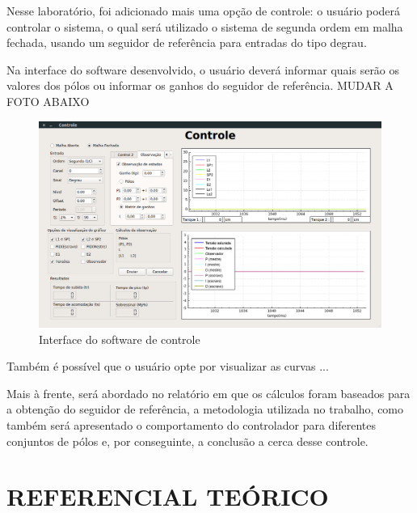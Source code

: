 \documentclass[a4paper,12pt]{article}
\begin{document}
\hspace{4ex}Nesse laboratório, foi adicionado mais uma opção de controle: o usuário poderá controlar o sistema, o qual será utilizado o sistema de segunda ordem em malha fechada, usando um seguidor de referência para entradas do tipo degrau.

\hspace{4ex}Na interface do software desenvolvido, o usuário deverá informar quais serão os valores dos pólos ou informar os ganhos do seguidor de referência.
MUDAR A FOTO ABAIXO
\begin{figure}[H]
\centering
\includegraphics[width=13cm]{fotosLab5/interfaceObs.png}
\caption{Interface do software de controle}
\label{interface}
\end{figure}

\hspace{4ex}Também é possível que o usuário opte por visualizar as curvas ...

\hspace{4ex}Mais à frente, será abordado no relatório em que os cálculos foram baseados para a obtenção do seguidor de referência, a metodologia utilizada no trabalho, como também será apresentado o comportamento do controlador para diferentes conjuntos de pólos e, por conseguinte, a conclusão a cerca desse controle.


\newpage


\thispagestyle{main}

\section{REFERENCIAL TEÓRICO}
\end{document}
